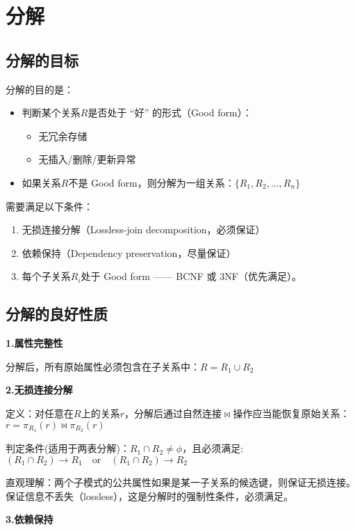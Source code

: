 \section{分解}

\subsection{分解的目标}

分解的目的是：
\begin{itemize}
    \item 判断某个关系$R$是否处于 “好” 的形式（Good form）：
       \begin{itemize}
          \item 无冗余存储
          \item 无插入/删除/更新异常
       \end{itemize}
    \item 如果关系$R$不是 Good form，则分解为一组关系：$\{R_1,R_2,...,R_n\}$
\end{itemize}

需要满足以下条件：
\begin{enumerate}
    \item 无损连接分解（Lossless-join decomposition，必须保证）
    \item 依赖保持（Dependency preservation，尽量保证）
    \item 每个子关系$R_i$处于 Good form —— BCNF 或 3NF（优先满足）。
\end{enumerate}

\subsection{分解的良好性质}

\noindent\textbf{1.属性完整性}

分解后，所有原始属性必须包含在子关系中：$R=R_1\cup R_2$

\noindent\textbf{2.无损连接分解}

定义：对任意在$R$上的关系$r$，分解后通过自然连接$\Join$操作应当能恢复原始关系：$r=\pi_{R_1}(r)\Join\pi_{R_2}(r)$

判定条件(适用于两表分解)：$R_1\cap R_2\neq\phi$，且必须满足:$(R_1\cap R_2)\to R_1\quad \text{or}\quad (R_1\cap R_2)\to R_2$

直观理解：两个子模式的公共属性如果是某一子关系的候选键，则保证无损连接。保证信息不丢失（lossless），这是分解时的强制性条件，必须满足。

\noindent\textbf{3.依赖保持}

